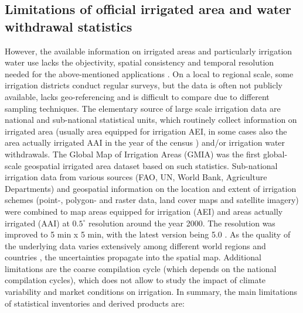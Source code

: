 \documentclass[hess, manuscript]{copernicus}
\begin{document}
\subsection{Limitations of official irrigated area and water withdrawal statistics}
However, the available information on irrigated areas and particularly irrigation water use lacks the objectivity, spatial consistency and temporal resolution needed for the above-mentioned applications \citep{Deines2017}. On a local to regional scale, some irrigation districts conduct regular surveys, but the data is often not publicly available, lacks geo-referencing and is difficult to compare due to different sampling techniques. The elementary source of large scale irrigation data are national and sub-national statistical units, which routinely collect information on irrigated area (usually area equipped for irrigation AEI, in some cases also the area actually irrigated AAI in the year of the census \citep{siebert-2005}) and/or irrigation water withdrawals. The Global Map of Irrigation Areas (GMIA) was the first global-scale geospatial irrigated area dataset \citep{Doell2002, doll2002global} based on such statistics. Sub-national irrigation data from various sources (FAO, UN, World Bank, Agriculture Departments) and geospatial information on the location and extent of irrigation schemes (point-, polygon- and raster data, land cover maps and satellite imagery) were combined to map areas equipped for irrigation (AEI) and areas actually irrigated (AAI) at $0.5^{\circ}$ resolution around the year 2000. The resolution was improved to 5 min x 5 min, with the latest version being 5.0 \citep{siebert-2005, Siebert2007}. As the quality of the underlying data varies extensively among different world regions and countries \citep{siebert-2005}, the uncertainties propagate into the spatial map. Additional limitations are the coarse compilation cycle (which depends on the national compilation cycles), which does not allow to study the impact of climate variability and market conditions on irrigation. In summary, the main limitations of statistical inventories and derived products are:
\end{document}
